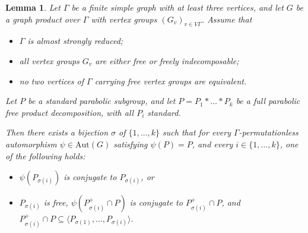 \documentclass[a4paper,english,11pt]{article}
\newtheorem{lemma}[de]{Lemma}
\theoremstyle{definition}
\theoremstyle{remark}
\newcommand{\Aut}{\mathrm{Aut}}
\begin{document}
\begin{lemma}\label{lemma:behaviour}
Let $\Gamma$ be a finite simple graph with at least three vertices, and let $G$ be a graph product over $\Gamma$ with vertex groups $(G_v)_{v\in V\Gamma}$. Assume that
\begin{itemize}
\item $\Gamma$ is almost strongly reduced;
\item all vertex groups $G_v$ are either free or freely indecomposable;
\item no two vertices of $\Gamma$ carrying free vertex groups are equivalent.
\end{itemize}
Let $P$ be a standard parabolic subgroup, and let $P=P_1\ast\dots\ast P_k$ be a full parabolic free product decomposition, with all $P_i$ standard.

Then there exists a bijection $\sigma$ of $\{1,\dots,k\}$ such that for every $\Gamma$-permutationless automorphism $\psi\in\Aut(G)$ satisfying $\psi(P)=P$, and every $i\in\{1,\dots,k\}$, one of the following holds:
\begin{itemize}
\item $\psi(P_{\sigma(i)})$ is conjugate to $P_{\sigma(i)}$, or
\item $P_{\sigma(i)}$ is free, $\psi(P_{\sigma(i)}^+\cap P)$ is conjugate to $P_{\sigma(i)}^+\cap P$, and $P_{\sigma(i)}^+\cap P\subseteq \langle P_{\sigma(1)},\dots,P_{\sigma(i)}\rangle$.
\end{itemize}
\end{lemma}
\end{document}
